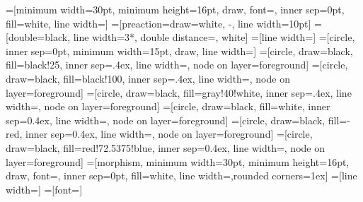 
\makeatletter
{}
\def\node@on@layer{\aftergroup\node@@on@layer}
\makeatother\def\thickness{0.7pt}
=[minimum width=30pt, minimum height=16pt, draw, font=\small, inner sep=0pt, fill=white, line width=\thickness]
=[preaction={draw=white, -, line width=10pt}]
=[double=black, line width=3*\thickness, double distance=\thickness, white]
=[line width=\thickness]
=[circle, inner sep=0pt, minimum width=15pt, draw, line width=\thickness]
=[circle, draw=black, fill=black!25, inner sep=.4ex, line width=\thickness, node on layer=foreground]
=[circle, draw=black, fill=black!100, inner sep=.4ex, line width=\thickness, node on layer=foreground]
=[circle, draw=black, fill=gray!40!white, inner sep=.4ex, line width=\thickness, node on layer=foreground]
=[circle, draw=black, fill=white, inner sep=0.4ex, line width=\thickness, node on layer=foreground]
=[circle, draw=black, fill=-red, inner sep=0.4ex, line width=\thickness, node on layer=foreground]
=[circle, draw=black, fill=red!72.5375!blue, inner sep=0.4ex, line width=\thickness, node on layer=foreground]
=[morphism, minimum width=30pt, minimum height=16pt, draw, font=\small, inner sep=0pt, fill=white, line width=\thickness,rounded corners=1ex]
=[line width=\thickness]
=[font=\tiny]


